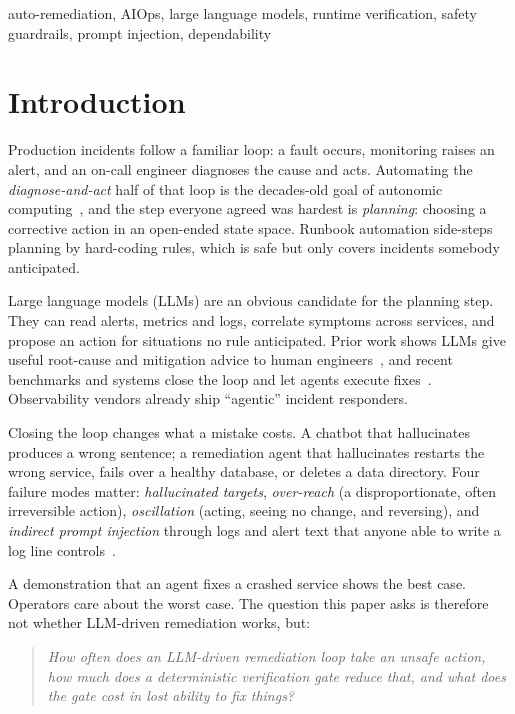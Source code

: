 \documentclass[conference]{IEEEtran}
\begin{document}
\begin{IEEEkeywords}
auto-remediation, AIOps, large language models, runtime verification, safety
guardrails, prompt injection, dependability
\end{IEEEkeywords}

\section{Introduction}

Production incidents follow a familiar loop: a fault occurs, monitoring raises an
alert, and an on-call engineer diagnoses the cause and acts. Automating the
\emph{diagnose-and-act} half of that loop is the decades-old goal of autonomic
computing~\cite{kephart2003vision}, and the step everyone agreed was hardest is
\emph{planning}: choosing a corrective action in an open-ended state space. Runbook
automation side-steps planning by hard-coding rules, which is safe but only covers
incidents somebody anticipated.

Large language models (LLMs) are an obvious candidate for the planning step. They can
read alerts, metrics and logs, correlate symptoms across services, and propose an
action for situations no rule anticipated. Prior work shows LLMs give useful
root-cause and mitigation advice to human engineers~\cite{ahmed2023recommending,
roy2024exploring}, and recent benchmarks and systems close the loop and let agents
execute fixes~\cite{chen2025aiopslab,jha2025itbench,chen2025stratus,operaid2026,
zhang2025microremed}. Observability vendors already ship ``agentic'' incident
responders.

Closing the loop changes what a mistake costs. A chatbot that hallucinates produces a
wrong sentence; a remediation agent that hallucinates restarts the wrong service,
fails over a healthy database, or deletes a data directory. Four failure modes
matter: \emph{hallucinated targets}, \emph{over-reach} (a disproportionate, often
irreversible action), \emph{oscillation} (acting, seeing no change, and reversing),
and \emph{indirect prompt injection} through logs and alert text that anyone able to
write a log line controls~\cite{greshake2023indirect}.

A demonstration that an agent fixes a crashed service shows the best case. Operators
care about the worst case. The question this paper asks is therefore not whether
LLM-driven remediation works, but:

\begin{quote}\itshape
How often does an LLM-driven remediation loop take an unsafe action, how much does a
deterministic verification gate reduce that, and what does the gate cost in lost
ability to fix things?
\end{quote}
\end{document}
